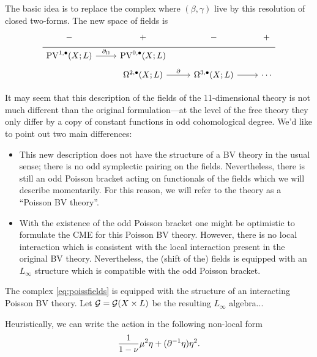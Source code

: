 \documentclass[11pt]{amsart}
\begin{document}
The basic idea is to replace the complex where $(\beta,\gamma)$ live by this resolution of closed two-forms. 
The new space of fields is 
\begin{equation}
  \label{eq:poissfields} 
  \begin{tikzcd}[row sep = 1 ex]
     - & + & - & + \\ \hline
     \PV^{1,\bu}(X; L) \ar[r, "\div"] & \PV^{0,\bu}(X; L) \\
     & \Omega^{2,\bu}(X;L) \ar[r, "\del"] & \Omega^{3,\bu}(X;L) \ar[r] & \cdots 
\end{tikzcd}
\end{equation}

It may seem that this description of the fields of the 11-dimensional theory is not much different than the original formulation---at the level of the free theory they only differ by a copy of constant functions in odd cohomological degree. 
We'd like to point out two main differences:
\begin{itemize}
\item This new description does not have the structure of a BV theory in the usual sense; there is no odd symplectic pairing on the fields. 
Nevertheless, there is still an odd Poisson bracket acting on functionals of the fields which we will describe momentarily. 
For this reason, we will refer to the theory as a ``Poisson BV theory''. 
\item With the existence of the odd Poisson bracket one might be optimistic to formulate the CME for this Poisson BV theory.
However, there is no local interaction which is consistent with the local interaction present in the original BV theory. 
Nevertheless, the (shift of the) fields is equipped with an $L_\infty$ structure which is compatible with the odd Poisson bracket. 
\end{itemize}

\begin{prop}
The complex \eqref{eq:poissfields} is equipped with the structure of an interacting Poisson BV theory.
Let $\mathcal G = \mathcal G(X \times L)$ be the resulting $L_\infty$ algebra...
\end{prop}

Heuristically, we can write the action in the following non-local form
\[
\frac{1}{1-\nu} \mu^2 \eta + (\partial^{-1} \eta) \eta^2 .
\]
\end{document}
